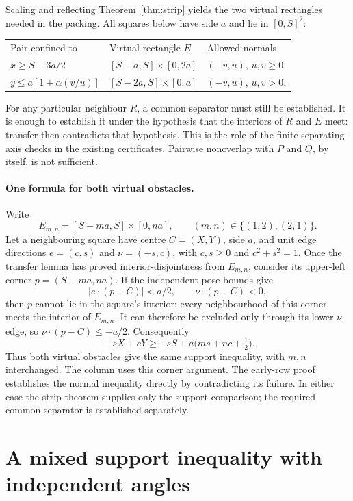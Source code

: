 \documentclass[11pt]{article}
\begin{document}
Scaling and reflecting Theorem~\ref{thm:strip} yields the two virtual
rectangles needed in the packing. All squares below have side $a$ and
lie in $[0,S]^2$:
\begin{center}
\begin{tabular}{lll}
Pair confined to & Virtual rectangle $E$ & Allowed normals\\[2pt]
$x\ge S-3a/2$ & $[S-a,S]\times[0,2a]$ & $(-v,u)$, $u,v\ge0$\\
$y\le a[1+\alpha(v/u)]$ & $[S-2a,S]\times[0,a]$ & $(-v,u)$, $u,v>0$.
\end{tabular}
\end{center}
For any particular neighbour $R$, a common separator must still be
established. It is enough to establish it under the hypothesis that
the interiors of $R$ and $E$ meet: transfer then contradicts that hypothesis.
This is the role of the finite separating-axis checks in the existing
certificates. Pairwise nonoverlap with $P$ and $Q$, by itself, is not
sufficient.

\paragraph{One formula for both virtual obstacles.}
Write
\[
 E_{m,n}=[S-ma,S]\times[0,na],\qquad
 (m,n)\in\{(1,2),(2,1)\}.
\]
Let a neighbouring square have centre $C=(X,Y)$, side $a$, and unit edge
directions $e=(c,s)$ and $\nu=(-s,c)$, with $c,s\ge0$ and $c^2+s^2=1$.
Once the transfer lemma has proved
interior-disjointness from $E_{m,n}$, consider its upper-left corner
$p=(S-ma,na)$. If the independent pose bounds give
\[
 |e\cdot(p-C)|<a/2,\qquad \nu\cdot(p-C)<0,
\]
then $p$ cannot lie in the square's interior: every neighbourhood of this
corner meets the interior of $E_{m,n}$. It can therefore be excluded only
through its lower $\nu$-edge, so $\nu\cdot(p-C)\le-a/2$. Consequently
\begin{equation}\label{eq:virtual-unified}
 \boxed{\;-sX+cY\ge-sS+a\bigl(ms+nc+\tfrac12\bigr).\;}
\end{equation}
Thus both virtual obstacles give the same support inequality, with
$m,n$ interchanged. The column uses this corner argument. The early-row
proof establishes the normal inequality directly by contradicting its
failure. In either case the strip theorem supplies only the support
comparison; the required common separator is established separately.


\section{A mixed support inequality with independent angles}
\label{sec:mixed-alignment}
\end{document}
